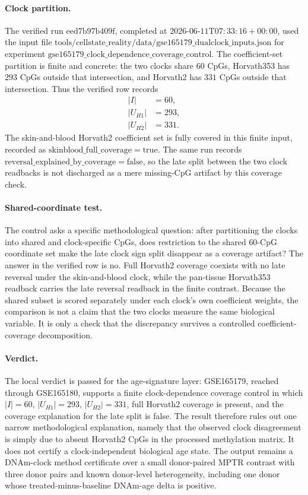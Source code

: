 \paragraph{Clock partition.}
The verified run $\mathrm{eed7b97b409f}$, completed at $\mathrm{2026\text{-}06\text{-}11T07{:}33{:}16+00{:}00}$, used the input file $\mathrm{tools/cellstate\_reality/data/gse165179\_dualclock\_inputs.json}$ for experiment $\mathrm{gse165179\_clock\_dependence\_coverage\_control}$. The coefficient-set partition is finite and concrete: the two clocks share $60$ CpGs, Horvath353 has $293$ CpGs outside that intersection, and Horvath2 has $331$ CpGs outside that intersection. Thus the verified row records
$$
\begin{aligned}
|I|&=60,\\
|U_{H1}|&=293,\\
|U_{H2}|&=331.
\end{aligned}
$$
The skin-and-blood Horvath2 coefficient set is fully covered in this finite input, recorded as $\mathrm{skinblood\_full\_coverage}=\mathrm{true}$. The same run records $\mathrm{reversal\_explained\_by\_coverage}=\mathrm{false}$, so the late split between the two clock readbacks is not discharged as a mere missing-CpG artifact by this coverage check.

\paragraph{Shared-coordinate test.}
The control asks a specific methodological question: after partitioning the clocks into shared and clock-specific CpGs, does restriction to the shared $60$-CpG coordinate set make the late clock sign split disappear as a coverage artifact? The answer in the verified row is no. Full Horvath2 coverage coexists with no late reversal under the skin-and-blood clock, while the pan-tissue Horvath353 readback carries the late reversal readback in the finite contrast. Because the shared subset is scored separately under each clock's own coefficient weights, the comparison is not a claim that the two clocks measure the same biological variable. It is only a check that the discrepancy survives a controlled coefficient-coverage decomposition.

\paragraph{Verdict.}
The local verdict is passed for the age-signature layer: GSE165179, reached through GSE165180, supports a finite clock-dependence coverage control in which $|I|=60$, $|U_{H1}|=293$, $|U_{H2}|=331$, full Horvath2 coverage is present, and the coverage explanation for the late split is false. The result therefore rules out one narrow methodological explanation, namely that the observed clock disagreement is simply due to absent Horvath2 CpGs in the processed methylation matrix. It does not certify a clock-independent biological age state. The output remains a DNAm-clock method certificate over a small donor-paired MPTR contrast with three donor pairs and known donor-level heterogeneity, including one donor whose treated-minus-baseline DNAm-age delta is positive.

